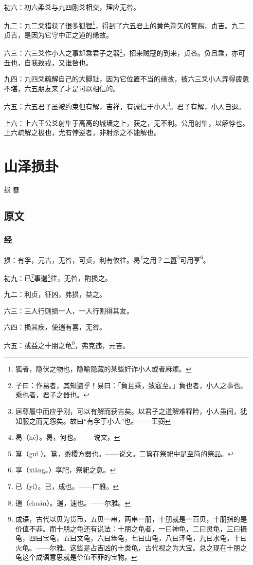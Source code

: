 \documentclass[12pt,oneside]{book}
\begin{document}
初六：初六柔爻与九四刚爻相交，理应无咎。

九二：九二爻猎获了很多狐狸\footnote{狐者，隐伏之物也，隐喻隐藏的某些奸诈小人或者麻烦。}，得到了六五君上的黄色箭矢的赏赐，贞吉。九二贞吉，是因为它守中正之道的缘故。

六三：六三爻作小人之事却乘君子之器\footnote{子曰：作易者，其知盜乎！易曰：「負且乘，致寇至。」負也者，小人之事也。乘也者，君子之器也。}，招来贼寇的到来，贞吝。负且乘，亦可丑也，自我致戎，又谁咎也。

九四：九四爻疏解自己的大脚趾，因为它位置不当的缘故，被六三爻小人弄得疲惫不堪，六五朋友来了才是可以相信的。

六五：六五君子虽被约束但有解，吉祥，有诚信于小人\footnote{居尊履中而应乎刚，可以有解而获吉矣。以君子之道解难释险，小人虽间，犹知服之而无怨矣。故曰“有孚于小人”也。——王弼}。君子有解，小人自退。

上六：上六王公爻射隼于高高的城墙之上，获之，无不利。公用射隼，以解悖也。上六疏解之极也，尤有悖逆者，非射杀之不能解也。


\chapter{山泽损卦}
损 {\Large ䷨}
\section{原文}

\subsection{经}
损：有孚，元吉，无咎，可贞，利有攸往。曷\footnote{曷（hé）。曷，何也。——说文。}之用？二簋\footnote{簋（guǐ ）。簋，黍稷方器也。——说文。二簋在祭祀中是至简的祭品。}可用享\footnote{享（xiǎng。）享祀，祭祀之意。}。

初九：已\footnote{已（yǐ）。已，成也。——广雅。}事遄\footnote{遄（chuán）。遄，速也。——尔雅。}往，无咎，酌损之。

九二：利贞，征凶，弗损，益之。

六三：三人行则损一人，一人行则得其友。

六四：损其疾，使遄有喜，无咎。

六五：或益之十朋之龟\footnote{成语，古代以贝为货币，五贝一串，两串一朋，十朋就是一百贝，十朋指的是价值不菲。而十朋之龟还有说法：十朋之龟者，一曰神龟，二曰灵龟，三曰摄龟，四曰宝龟，五曰文龟，六曰筮龟，七曰山龟，八曰泽龟，九曰水龟，十曰火龟。——尔雅。这些是占吉凶的十类龟，古代视之为大宝。总之现在十朋之龟这个成语意思就是价值不菲的宝物。}，弗克违，元吉。
\end{document}
